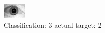 \begin{figure}[h!]
\begin{center}
\includegraphics[width=0.60\columnwidth]{figures/ID1653_class_3_target_2.png}
\end{center}
\caption{ Classification: 3 actual target: 2}
\label{fig:ID1653_class_3_target_2}
\end{figure}
